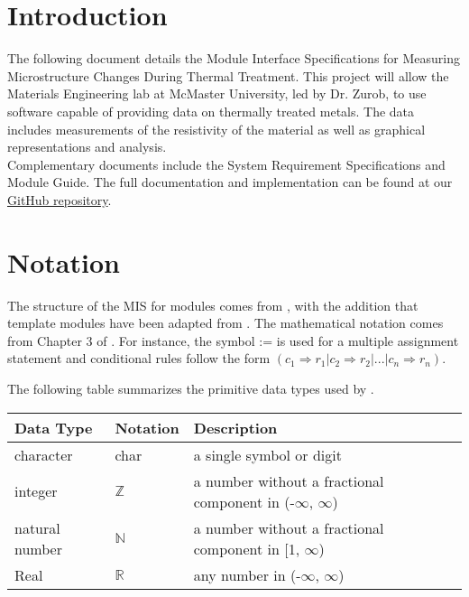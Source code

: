 \documentclass[12pt, titlepage]{article}
\begin{document}
\newpage

\tableofcontents

\newpage


\section{Introduction}

\noindent The following document details the Module Interface Specifications for Measuring Microstructure Changes During Thermal Treatment. This project will allow the Materials Engineering lab at McMaster University, led by Dr. Zurob, to use software capable of providing data on thermally treated metals. The data includes measurements of the resistivity of the material as well as graphical representations and analysis. \\

\noindent Complementary documents include the System Requirement Specifications and Module Guide. The full documentation and implementation can be found at our \href{https://github.com/edwin-do/capstoneTeam30}{GitHub repository}.

\section{Notation}

The structure of the MIS for modules comes from \citet{HoffmanAndStrooper1995},
with the addition that template modules have been adapted from
\cite{GhezziEtAl2003}.  The mathematical notation comes from Chapter 3 of
\citet{HoffmanAndStrooper1995}.  For instance, the symbol := is used for a
multiple assignment statement and conditional rules follow the form $(c_1
\Rightarrow r_1 | c_2 \Rightarrow r_2 | ... | c_n \Rightarrow r_n )$.

The following table summarizes the primitive data types used by \progname. 

\begin{center}
\renewcommand{\arraystretch}{1.2}
\noindent 
\begin{tabular}{l l p{7.5cm}} 
\toprule 
\textbf{Data Type} & \textbf{Notation} & \textbf{Description}\\ 
\midrule
character & char & a single symbol or digit\\
integer & $\mathbb{Z}$ & a number without a fractional component in (-$\infty$, $\infty$) \\
natural number & $\mathbb{N}$ & a number without a fractional component in [1, $\infty$) \\
Real & $\mathbb{R}$ & any number in (-$\infty$, $\infty$)\\
\bottomrule
\end{tabular} 
\end{center}
\end{document}
